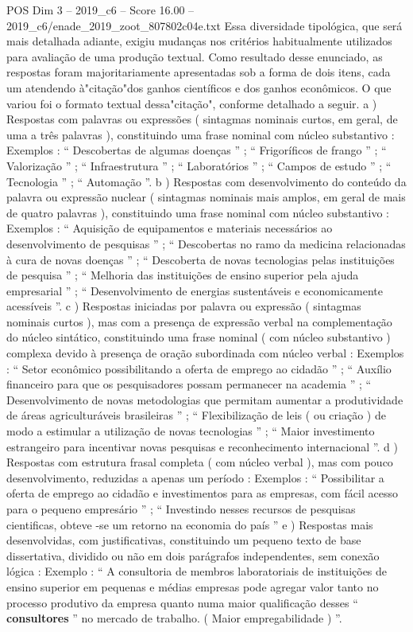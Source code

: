 \begin{textsample}{POS Dim 3 – 2019\_c6 – Score 16.00 – 2019\_c6/enade\_2019\_zoot\_807802c04e.txt}
Essa diversidade tipológica, que será mais detalhada adiante, exigiu mudanças nos critérios habitualmente utilizados para avaliação de uma produção textual.
Como resultado desse enunciado, as respostas foram majoritariamente apresentadas sob a forma de dois itens, cada um atendendo à"citação"dos ganhos científicos e dos ganhos econômicos.
O que variou foi o formato textual dessa"citação", conforme detalhado a seguir. a ) Respostas com palavras ou expressões ( sintagmas nominais curtos, em geral, de uma a três palavras ), constituindo uma frase nominal com núcleo substantivo : Exemplos : “ Descobertas de algumas doenças ” ; “ Frigoríficos de frango ” ; “ Valorização ” ; “ Infraestrutura ” ; “ Laboratórios ” ; “ Campos de estudo ” ; “ Tecnologia ” ; “ Automação ”. b ) Respostas com desenvolvimento do conteúdo da palavra ou expressão nuclear ( sintagmas nominais mais amplos, em geral de mais de quatro palavras ), constituindo uma frase nominal com núcleo substantivo : Exemplos : “ Aquisição de equipamentos e materiais necessários ao desenvolvimento de pesquisas ” ; “ Descobertas no ramo da medicina relacionadas à cura de novas doenças ” ; “ Descoberta de novas tecnologias pelas instituições de pesquisa ” ; “ Melhoria das instituições de ensino superior pela ajuda empresarial ” ; “ Desenvolvimento de energias sustentáveis e economicamente acessíveis ”. c ) Respostas iniciadas por palavra ou expressão ( sintagmas nominais curtos ), mas com a presença de expressão verbal na complementação do núcleo sintático, constituindo uma frase nominal ( com núcleo substantivo ) complexa devido à presença de oração subordinada com núcleo verbal : Exemplos : “ Setor econômico possibilitando a oferta de emprego ao cidadão ” ; “ Auxílio financeiro para que os pesquisadores possam permanecer na academia ” ; “ Desenvolvimento de novas metodologias que permitam aumentar a produtividade de áreas agriculturáveis brasileiras ” ; “ Flexibilização de leis ( ou criação ) de modo a estimular a utilização de novas tecnologias ” ; “ Maior investimento estrangeiro para incentivar novas pesquisas e reconhecimento internacional ”. d ) Respostas com estrutura frasal completa ( com núcleo verbal ), mas com pouco desenvolvimento, reduzidas a apenas um período : Exemplos : “ Possibilitar a oferta de emprego ao cidadão e investimentos para as empresas, com fácil acesso para o pequeno empresário ” ; “ Investindo nesses recursos de pesquisas cientificas, obteve -se um retorno na economia do país ” e ) Respostas mais desenvolvidas, com justificativas, constituindo um pequeno texto de base dissertativa, dividido ou não em dois parágrafos independentes, sem conexão lógica : Exemplo : “ A consultoria de membros laboratoriais de instituições de ensino superior em pequenas e médias empresas pode agregar valor tanto no processo produtivo da empresa quanto numa maior qualificação desses “ \textbf{consultores} ” no mercado de trabalho. ( Maior empregabilidade ) ”.

\end{textsample}
